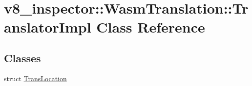 \hypertarget{classv8__inspector_1_1WasmTranslation_1_1TranslatorImpl}{}\section{v8\+\_\+inspector\+:\+:Wasm\+Translation\+:\+:Translator\+Impl Class Reference}
\label{classv8__inspector_1_1WasmTranslation_1_1TranslatorImpl}
\subsection*{Classes}
\begin{DoxyCompactItemize}
\item 
struct \mbox{\hyperlink{structv8__inspector_1_1WasmTranslation_1_1TranslatorImpl_1_1TransLocation}{Trans\+Location}}
\end{DoxyCompactItemize}
